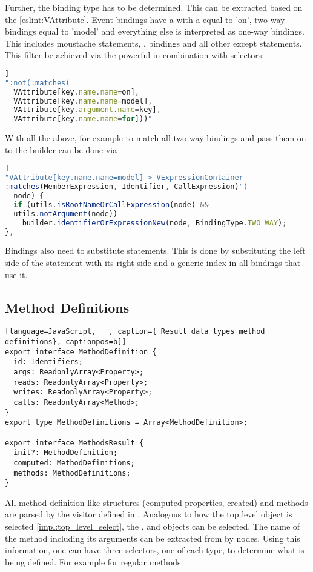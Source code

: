 Further, the binding type has to be determined. This can be extracted based on the  \ref{eslint:VAttribute}. Event bindings have a  with a  equal to 'on', two-way bindings equal to 'model' and everything else is interpreted as one-way bindings. This includes moustache statements, ,  bindings and all other except  statements. This filter be achieved via the powerful  in combination with  selectors: 
\begin{lstlisting}[language=JavaScript,caption={Selector one-way bindings}, captionpos=b]]
":not(:matches(
  VAttribute[key.name.name=on], 
  VAttribute[key.name.name=model],
  VAttribute[key.argument.name=key],
  VAttribute[key.name.name=for]))"
\end{lstlisting}

With all the above, for example to match all two-way bindings and pass them on to the builder can be done via
\begin{lstlisting}[language=JavaScript,caption={Selector and visit for two-way bindings}, captionpos=b]]
"VAttribute[key.name.name=model] > VExpressionContainer
:matches(MemberExpression, Identifier, CallExpression)"(
  node) {
  if (utils.isRootNameOrCallExpression(node) && 
  utils.notArgument(node))
    builder.identifierOrExpressionNew(node, BindingType.TWO_WAY);
},
\end{lstlisting}

Bindings also need to substitute  statements. This is done by substituting the left side of the  statement with its right side and a generic index in all bindings that use it.

\subsection{Method Definitions}

\begin{lstlisting}[language=JavaScript,   , caption={ Result data types method definitions}, captionpos=b]]
export interface MethodDefinition {
  id: Identifiers;
  args: ReadonlyArray<Property>;
  reads: ReadonlyArray<Property>;
  writes: ReadonlyArray<Property>;
  calls: ReadonlyArray<Method>;
}
export type MethodDefinitions = Array<MethodDefinition>;

export interface MethodsResult {
  init?: MethodDefinition;
  computed: MethodDefinitions;
  methods: MethodDefinitions;
}
\end{lstlisting}
All method definition like structures (computed properties, created) and methods are parsed by the visitor defined in .
Analogous to how the top level  object is selected \ref{impl:top_level_select}, the ,  and  objects can be selected. 
The name of the method including its arguments can be extracted from by  nodes. Using this information, one can have three selectors, one of each type, to determine what is being defined. For example for regular methods:
 
